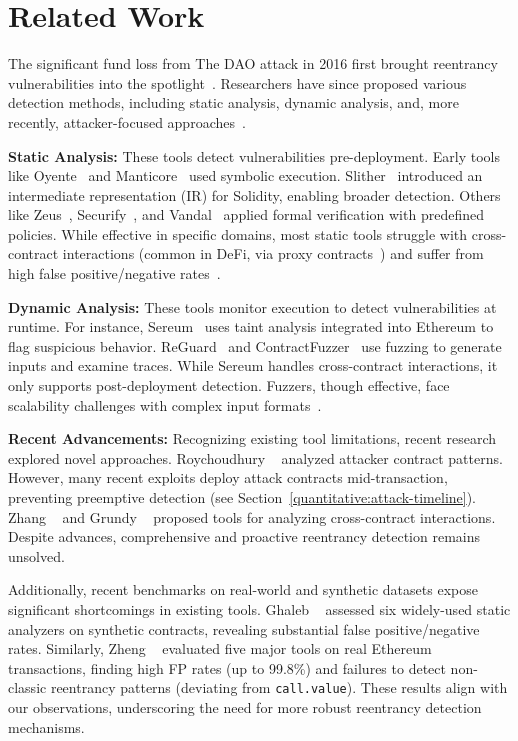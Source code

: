\section{Related Work}

The significant fund loss from The DAO attack in 2016 first brought reentrancy vulnerabilities into the spotlight~\cite{the-dao-analysis}. Researchers have since proposed various detection methods, including static analysis, dynamic analysis, and, more recently, attacker-focused approaches~\cite{survey:detection}.

\textbf{Static Analysis:} These tools detect vulnerabilities pre-deployment. Early tools like Oyente~\cite{oyente} and Manticore~\cite{manticore} used symbolic execution. Slither~\cite{slither} introduced an intermediate representation (IR) for Solidity, enabling broader detection. Others like Zeus~\cite{zeus}, Securify~\cite{securify}, and Vandal~\cite{vandal} applied formal verification with predefined policies. While effective in specific domains, most static tools struggle with cross-contract interactions (common in DeFi, \eg via proxy contracts~\cite{erc1967}) and suffer from high false positive/negative rates~\cite{survey:static-analysis}.

\textbf{Dynamic Analysis:} These tools monitor execution to detect vulnerabilities at runtime. For instance, Sereum~\cite{sereum} uses taint analysis integrated into Ethereum to flag suspicious behavior. ReGuard~\cite{reguard} and ContractFuzzer~\cite{contractfuzzer} use fuzzing to generate inputs and examine traces. While Sereum handles cross-contract interactions, it only supports post-deployment detection. Fuzzers, though effective, face scalability challenges with complex input formats~\cite{fuzzing-review}.

\textbf{Recent Advancements:} Recognizing existing tool limitations, recent research explored novel approaches. Roychoudhury \etal~\cite{attack-contract-detection} analyzed attacker contract patterns. However, many recent exploits deploy attack contracts mid-transaction, preventing preemptive detection (see Section~\ref{quantitative:attack-timeline}). Zhang \etal~\cite{smartreco} and Grundy \etal~\cite{clairvoyance} proposed tools for analyzing cross-contract interactions. Despite advances, comprehensive and proactive reentrancy detection remains unsolved.

Additionally, recent benchmarks on real-world and synthetic datasets expose significant shortcomings in existing tools. Ghaleb \etal~\cite{survey:static-analysis} assessed six widely-used static analyzers on synthetic contracts, revealing substantial false positive/negative rates. Similarly, Zheng \etal~\cite{turn-the-rudder} evaluated five major tools on real Ethereum transactions, finding high FP rates (up to 99.8\%) and failures to detect non-classic reentrancy patterns (\ie deviating from \lstinline{call.value}). These results align with our observations, underscoring the need for more robust reentrancy detection mechanisms.